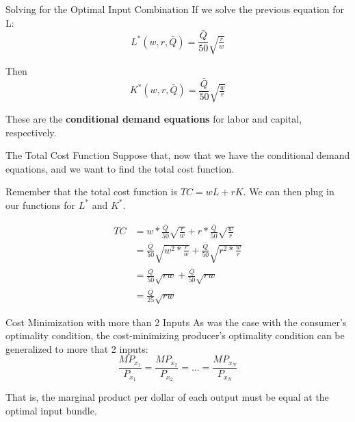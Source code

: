 \documentclass[11pt,t]{beamer}
\begin{document}
\begin{frame}{Solving for the Optimal Input Combination}
  If we solve the previous equation for L:
  \begin{equation*}
    L^*(w,r,\bar{Q})=\frac{\bar{Q}}{50}\sqrt{\tfrac{r}{w}}
  \end{equation*}

  \pause\bigskip
  Then
  \begin{equation*}
    K^*(w,r,\bar{Q}) =\frac{\bar{Q}}{50}\sqrt{\tfrac{w}{r}}
  \end{equation*}

  \bigskip
  These are the \textbf{conditional demand equations} for labor and capital, respectively.
\end{frame}

\begin{frame}{The Total Cost Function}
  Suppose that, now that we have the conditional demand equations, and we want to find the total cost function.

  \pause\bigskip
  Remember that the total cost function is $TC = wL + rK$. We can then plug in our functions for $L^*$ and $K^*$.

  \vspace*{-5mm}
  \begin{align*}
    TC &= w*\frac{\bar{Q}}{50}\sqrt{\tfrac{r}{w}} + r*\frac{\bar{Q}}{50}\sqrt{\tfrac{w}{r}}     \\
       &= \frac{\bar{Q}}{50}\sqrt{w^2*\tfrac{r}{w}} + \frac{\bar{Q}}{50}\sqrt{r^2*\tfrac{w}{r}} \\
       &= \frac{\bar{Q}}{50}\sqrt{rw} + \frac{\bar{Q}}{50}\sqrt{rw}                             \\
       &= \frac{\bar{Q}}{25}\sqrt{rw}
  \end{align*}
\end{frame}

\begin{frame}{Cost Minimization with more than 2 Inputs}
  As was the case with the consumer's optimality condition, the cost-minimizing producer's optimality condition can be generalized to more that 2 inputs:
  \begin{equation*}
    \frac{MP_{x_1}}{P_{x_1}}=\frac{MP_{x_2}}{P_{x_2}}=...=\frac{MP_{x_N}}{P_{x_N}}
  \end{equation*}

  \bigskip
  That is, the marginal product per dollar of each output must be equal at the optimal input bundle.
\end{frame}
\end{document}
